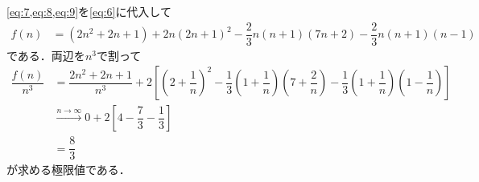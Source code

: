\documentclass[../../main.tex]{subfiles}
\begin{document}
\cref{eq:7,eq:8,eq:9}を\cref{eq:6}に代入して
\begin{align}
  f(n)
  &= (2n^2+2n+1) +  2n(2n+1)^2 - \dfrac{2}{3} n(n+1)(7n+2) - \dfrac{2}{3} n(n+1)(n-1)
\end{align}
である．両辺を$n^3$で割って
\begin{align}
  \dfrac{f(n)}{n^3}
  &= \dfrac{2n^2+2n+1}{n^3} + 2 \left[ \left(2 + \dfrac{1}{n}\right)^2 - \dfrac{1}{3}\left(1 + \dfrac{1}{n}\right)\left(7 + \dfrac{2}{n}\right) - \dfrac{1}{3}\left(1 + \dfrac{1}{n}\right)\left(1 - \dfrac{1}{n}\right) \right] \\
  &\xrightarrow{n \to \infty} 0 + 2 \left[ 4 - \dfrac{7}{3} - \dfrac{1}{3} \right] \\
  &= \dfrac{8}{3}
\end{align}
が求める極限値である．

\newpage
\end{document}
